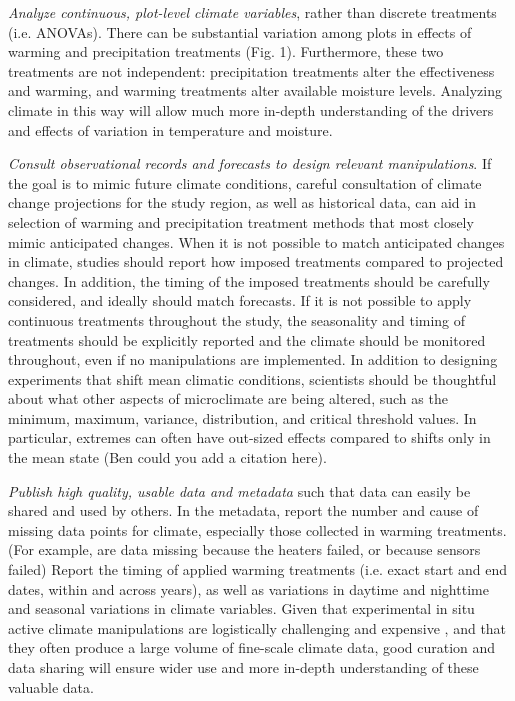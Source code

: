 \documentclass{article}
\begin{document}
\par\textit{Analyze continuous, plot-level climate variables}, rather than discrete treatments (i.e. ANOVAs). There can be substantial variation among plots in effects of warming and precipitation treatments (Fig. 1). Furthermore, these two treatments are not independent: precipitation treatments alter the effectiveness and warming, and warming treatments alter available moisture levels. Analyzing climate in this way will allow much more in-depth understanding of the drivers and effects of variation in temperature and moisture.
\par\textit{Consult observational records and forecasts to design relevant manipulations}. If the goal is to mimic future climate conditions, careful consultation of climate change projections for the study region, as well as historical data, can aid in selection of warming and precipitation treatment methods that most closely mimic anticipated changes. When it is not possible to match anticipated changes in climate, studies should report how imposed treatments compared to projected changes. In addition, the timing of the imposed treatments should be carefully considered, and ideally should match forecasts. If it is not possible to apply continuous treatments throughout the study, the seasonality and timing of treatments should be explicitly reported and the climate should be monitored throughout, even if no manipulations are implemented. In addition to designing experiments that shift mean climatic conditions, scientists should be thoughtful about what other aspects of microclimate are being altered, such as the minimum, maximum, variance, distribution, and critical threshold values. In particular, extremes can often have out-sized effects compared to shifts only in the mean state (Ben could you add a citation here).
\par\textit{Publish high quality, usable data and metadata} such that data can easily be shared and used by others. In the metadata, report the number and cause of missing data points for climate, especially those collected in warming treatments. (For example, are data missing because the heaters failed, or because sensors failed) Report the timing of applied warming treatments (i.e. exact start and end dates, within and across years), as well as variations in daytime and nighttime and seasonal variations in climate variables. Given that experimental in situ active climate  manipulations are logistically challenging  and expensive \citep{aronson2009}, and that they often produce a large volume of fine-scale climate data, good curation and data sharing will ensure wider use and more in-depth understanding of these valuable data. 
\end{document}
